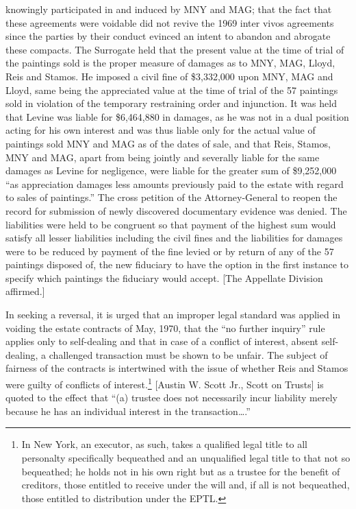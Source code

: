 knowingly participated in and induced by MNY and MAG; that the fact that these
agreements were voidable did not revive the 1969 inter vivos agreements since
the parties by their conduct evinced an intent to abandon and abrogate these
compacts. The Surrogate held that the present value at the time of trial of the
paintings sold is the proper measure of damages as to MNY, MAG, Lloyd, Reis and
Stamos. He imposed a civil fine of \$3,332,000 upon MNY, MAG and Lloyd, same
being the appreciated value at the time of trial of the 57 paintings sold in
violation of the temporary restraining order and injunction. It was held that
Levine was liable for \$6,464,880 in damages, as he was not in a dual position
acting for his own interest and was thus liable only for the actual value of
paintings sold MNY and MAG as of the dates of sale, and that Reis, Stamos, MNY
and MAG, apart from being jointly and severally liable for the same damages as
Levine for negligence, were liable for the greater sum of \$9,252,000 ``as
appreciation damages less amounts previously paid to the estate with regard to
sales of paintings.'' The cross petition of the Attorney-General to reopen the
record for submission of newly discovered documentary evidence was denied. The
liabilities were held to be congruent so that payment of the highest sum would
satisfy all lesser liabilities including the civil fines and the liabilities for
damages were to be reduced by payment of the fine levied or by return of any of
the 57 paintings disposed of, the new fiduciary to have the option in the first
instance to specify which paintings the fiduciary would accept. [The Appellate
Division affirmed.]

In seeking a reversal, it is urged that an improper legal standard was applied
in voiding the estate contracts of May, 1970, that the ``no further inquiry''
rule applies only to self-dealing and that in case of a conflict of interest,
absent self-dealing, a challenged transaction must be shown to be unfair. The
subject of fairness of the contracts is intertwined with the issue of whether
Reis and Stamos were guilty of conflicts of interest.\footnote{In New York, an
executor, as such, takes a qualified legal title to all personalty specifically
bequeathed and an unqualified legal title to that not so bequeathed; he holds
not in his own right but as a trustee for the benefit of creditors, those
entitled to receive under the will and, if all is not bequeathed, those entitled
to distribution under the EPTL.} [Austin W. Scott Jr., Scott on Trusts] is
quoted to the effect that ``(a) trustee does not necessarily incur liability
merely because he has an individual interest in the transaction\ldots .''

